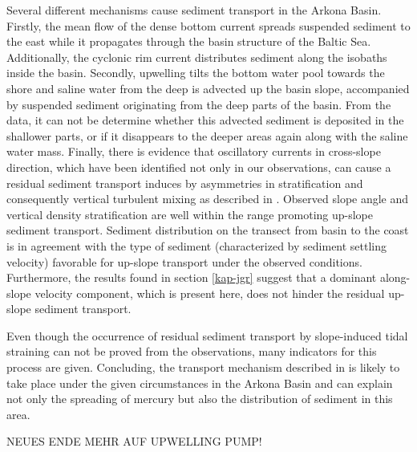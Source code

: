 Several different mechanisms cause sediment transport in the Arkona Basin. 
Firstly, the mean flow of 
the dense bottom current spreads suspended sediment to the east while it 
propagates through the basin structure of the Baltic Sea. Additionally, the 
cyclonic rim current distributes sediment along the isobaths inside the basin. 
Secondly, upwelling tilts the bottom water pool towards the shore and saline 
water from the deep is advected up the basin slope, accompanied by 
suspended sediment originating from the deep parts of the basin. From the data, 
it can not be determine whether this advected sediment is deposited in the 
shallower parts, or if it disappears to the deeper areas again along with the 
saline water mass. Finally, there is evidence that oscillatory currents 
in cross-slope direction, which have been identified not only in our 
observations, can cause a residual sediment transport induces by asymmetries in 
stratification and consequently vertical turbulent mixing as described in 
\cite{schulzumlauf2016}. Observed slope angle and vertical density 
stratification are well within the range promoting up-slope sediment 
transport. Sediment distribution on the transect from basin to the coast is in 
agreement with the type of sediment (characterized by sediment settling 
velocity) favorable for up-slope transport under the observed 
conditions. Furthermore, the results found in section \ref{kap-jgr} suggest 
that a dominant along-slope velocity component, which is present here, does not 
hinder the residual up-slope sediment transport.

Even though the occurrence of residual sediment transport by slope-induced tidal 
straining can not be proved from the observations, many indicators 
for this process are given. Concluding, the transport 
mechanism described in \cite{schulzumlauf2016} is likely to take place under 
the given circumstances in the Arkona Basin and can explain not only the 
spreading of mercury but also the distribution of sediment in this area.

NEUES ENDE MEHR AUF UPWELLING PUMP!